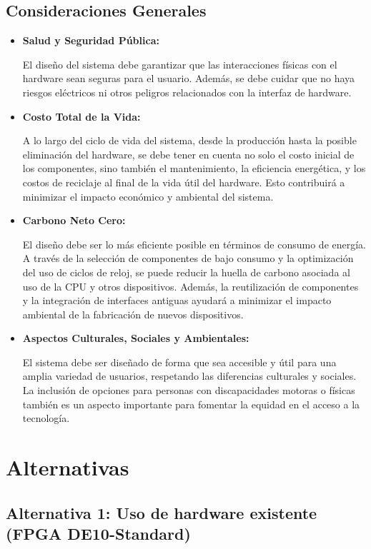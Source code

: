 \documentclass[conference]{IEEEtran}
\begin{document}
\subsection{Consideraciones Generales}
\begin{itemize}
	\item \textbf{Salud y Seguridad Pública:} 
	\par El diseño del sistema debe garantizar que las interacciones físicas con el hardware sean seguras para el usuario. Además, se debe cuidar que no haya riesgos eléctricos ni otros peligros relacionados con la interfaz de hardware.
	
	\item \textbf{Costo Total de la Vida: }
	\par A lo largo del ciclo de vida del sistema, desde la producción hasta la posible eliminación del hardware, se debe tener en cuenta no solo el costo inicial de los componentes, sino también el mantenimiento, la eficiencia energética, y los costos de reciclaje al final de la vida útil del hardware. Esto contribuirá a minimizar el impacto económico y ambiental del sistema.
	
	\item \textbf{Carbono Neto Cero:} 
	\par El diseño debe ser lo más eficiente posible en términos de consumo de energía. A través de la selección de componentes de bajo consumo y la optimización del uso de ciclos de reloj, se puede reducir la huella de carbono asociada al uso de la CPU y otros dispositivos. Además, la reutilización de componentes y la integración de interfaces antiguas ayudará a minimizar el impacto ambiental de la fabricación de nuevos dispositivos.
	
	\item \textbf{Aspectos Culturales, Sociales y Ambientales:}
	\par El sistema debe ser diseñado de forma que sea accesible y útil para una amplia variedad de usuarios, respetando las diferencias culturales y sociales. La inclusión de opciones para personas con discapacidades motoras o físicas también es un aspecto importante para fomentar la equidad en el acceso a la tecnología.
\end{itemize}


\section{Alternativas}

\subsection{Alternativa 1: Uso de hardware existente (FPGA DE10-Standard)}
\end{document}
